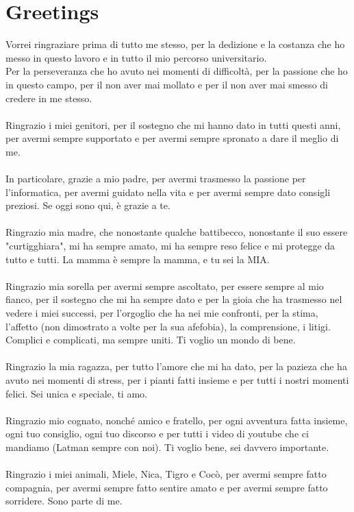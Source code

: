 \chapter*{Greetings}

Vorrei ringraziare prima di tutto me stesso, per la dedizione e la costanza che ho messo in questo lavoro e in tutto il mio percorso universitario.
\\Per la perseveranza che ho avuto nei momenti di difficoltà, per la passione che ho in questo campo, per il non aver mai mollato e per il non aver mai smesso di credere in me stesso.
\\\\Ringrazio i miei genitori, per il sostegno che mi hanno dato in tutti questi anni, per avermi sempre supportato e per avermi sempre spronato a dare il meglio di me.
\\\\In particolare, grazie a mio padre, per avermi trasmesso la passione per l'informatica, per avermi guidato nella vita e per avermi sempre dato consigli preziosi. Se oggi sono qui, è grazie a te.
\\\\Ringrazio mia madre, che nonostante qualche battibecco, nonostante il suo essere "curtigghiara", mi ha sempre amato, mi ha sempre reso felice e mi protegge da tutto e tutti. La mamma è sempre la mamma, e tu sei la MIA.
\\\\Ringrazio mia sorella per avermi sempre ascoltato, per essere sempre al mio fianco, per il sostegno che mi ha sempre dato e per la gioia che ha trasmesso nel vedere i miei successi, per l'orgoglio che ha nei mie confronti, per la stima, l'affetto (non dimostrato a volte per la sua afefobia), la comprensione, i litigi.
Complici e complicati, ma sempre uniti. Ti voglio un mondo di bene.
\\\\Ringrazio la mia ragazza, per tutto l'amore che mi ha dato, per la pazieza che ha avuto nei momenti di stress, per i pianti fatti insieme e per tutti i nostri momenti felici. Sei unica e speciale, ti amo.
\\\\Ringrazio mio cognato, nonché amico e fratello, per ogni avventura fatta insieme, ogni tuo consiglio, ogni tuo discorso e per tutti i video di youtube che ci mandiamo (Latman sempre con noi). Ti voglio bene, sei davvero importante.
\\\\Ringrazio i miei animali, Miele, Nica, Tigro e Cocò, per avermi sempre fatto compagnia, per avermi sempre fatto sentire amato e per avermi sempre fatto sorridere. Sono parte di me.
